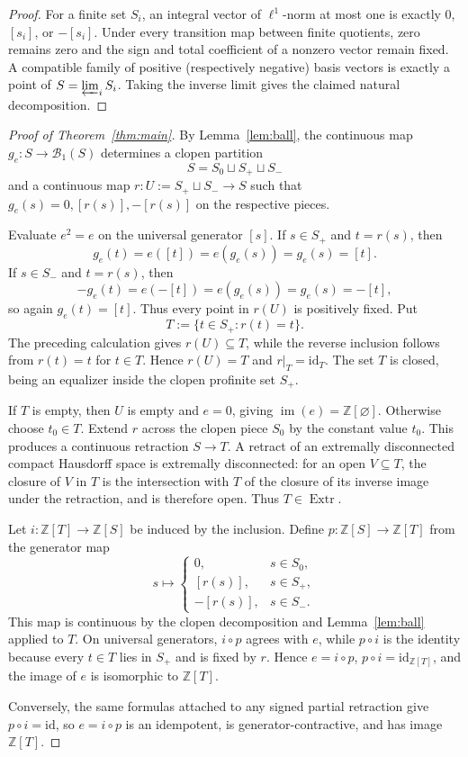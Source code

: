\documentclass[11pt]{article}
\newcommand{\Z}{\mathbb Z}
\newcommand{\Extr}{\operatorname{Extr}}
\newcommand{\im}{\operatorname{im}}
\newcommand{\Ball}{\mathcal B}
\begin{document}
\begin{proof}
For a finite set $S_i$, an integral vector of $\ell^1$-norm at most one is
exactly $0$, $[s_i]$, or $-[s_i]$.  Under every transition map between finite
quotients, zero remains zero and the sign and total coefficient of a nonzero
vector remain fixed.  A compatible family of positive (respectively
negative) basis vectors is exactly a point of
$S=\varprojlim_i S_i$.  Taking the inverse limit gives the claimed natural
decomposition.
\end{proof}

\begin{proof}[Proof of Theorem~\ref{thm:main}]
By Lemma~\ref{lem:ball}, the continuous map $g_e:S\to\Ball_1(S)$ determines
a clopen partition
\[
 S=S_0\sqcup S_+\sqcup S_-
\]
and a continuous map $r:U:=S_+\sqcup S_-\to S$ such that
$g_e(s)=0,[r(s)],-[r(s)]$ on the respective pieces.

Evaluate $e^2=e$ on the universal generator $[s]$.  If $s\in S_+$ and
$t=r(s)$, then
\[
 g_e(t)=e([t])=e(g_e(s))=g_e(s)=[t].
\]
If $s\in S_-$ and $t=r(s)$, then
\[
 -g_e(t)=e(-[t])=e(g_e(s))=g_e(s)=-[t],
\]
so again $g_e(t)=[t]$.  Thus every point in $r(U)$ is positively fixed.
Put
\[
 T:=\{t\in S_+:r(t)=t\}.
\]
The preceding calculation gives $r(U)\subseteq T$, while the reverse
inclusion follows from $r(t)=t$ for $t\in T$.  Hence $r(U)=T$ and
$r|_T=\mathrm{id}_T$.  The set $T$ is closed, being an equalizer inside the
clopen profinite set $S_+$.

If $T$ is empty, then $U$ is empty and $e=0$, giving $\im(e)=\Z[\varnothing]$.
Otherwise choose $t_0\in T$.  Extend $r$ across the clopen piece $S_0$ by the
constant value $t_0$.  This produces a continuous retraction $S\to T$.
A retract of an extremally disconnected compact Hausdorff space is
extremally disconnected: for an open $V\subseteq T$, the closure of $V$ in
$T$ is the intersection with $T$ of the closure of its inverse image under
the retraction, and is therefore open.  Thus $T\in\Extr$.

Let $i:\Z[T]\to\Z[S]$ be induced by the inclusion.  Define
$p:\Z[S]\to\Z[T]$ from the generator map
\[
 s\longmapsto
 \begin{cases}
 0,&s\in S_0,\\
 [r(s)],&s\in S_+,\\
 -[r(s)],&s\in S_-.
 \end{cases}
\]
This map is continuous by the clopen decomposition and Lemma~\ref{lem:ball}
applied to $T$.  On universal generators, $i\circ p$ agrees with $e$, while
$p\circ i$ is the identity because every $t\in T$ lies in $S_+$ and is fixed
by $r$.  Hence $e=i\circ p$, $p\circ i=\mathrm{id}_{\Z[T]}$, and the image of
$e$ is isomorphic to $\Z[T]$.

Conversely, the same formulas attached to any signed partial retraction give
$p\circ i=\mathrm{id}$, so $e=i\circ p$ is an idempotent, is
generator-contractive, and has image $\Z[T]$.
\end{proof}
\end{document}
